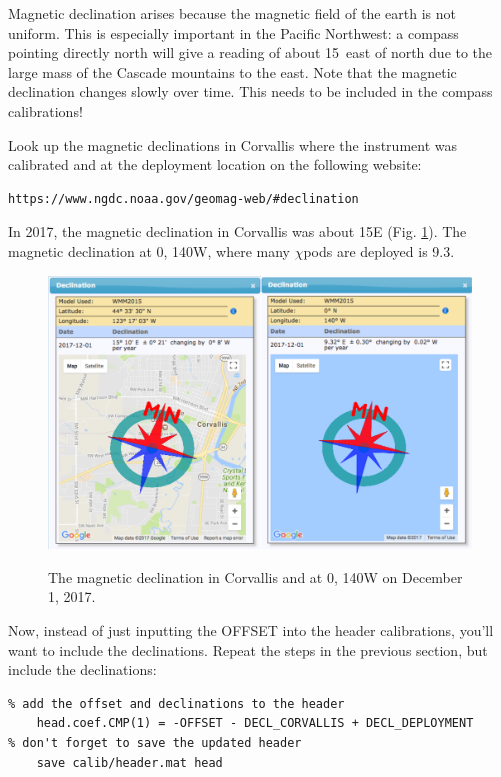\documentclass[12pt]{article}
\begin{document}
Magnetic declination arises because the magnetic field of the earth is not uniform. This is especially important in the Pacific Northwest: a compass pointing directly north will give a reading of about 15\degree \, east of north due to the large mass of the Cascade mountains to the east. Note that the magnetic declination changes slowly over time. This needs to be included in the compass calibrations!

Look up the magnetic declinations in Corvallis where the instrument was calibrated and at the deployment location on the following website:
\begin{verbatim}
https://www.ngdc.noaa.gov/geomag-web/#declination
\end{verbatim}
In 2017, the magnetic declination in Corvallis was about 15\degree E (Fig. \ref{fig:declination}). The magnetic declination at 0\degree, 140\degree W, where many $\chi$pods are deployed is 9.3\degree.

\begin{figure}
  \centering \centering\noindent\includegraphics[width=14cm,angle=0]{./figs/declination_both.pdf}\\
    \caption{The magnetic declination in Corvallis and at 0\degree, 140\degree W on December 1, 2017.}\label{fig:declination}
\end{figure}

Now, instead of just inputting the OFFSET into the header calibrations, you'll want to include the declinations. Repeat the steps in the previous section, but include the declinations:
\begin{verbatim}
% add the offset and declinations to the header
    head.coef.CMP(1) = -OFFSET - DECL_CORVALLIS + DECL_DEPLOYMENT
% don't forget to save the updated header
    save calib/header.mat head
\end{verbatim}
\end{document}
